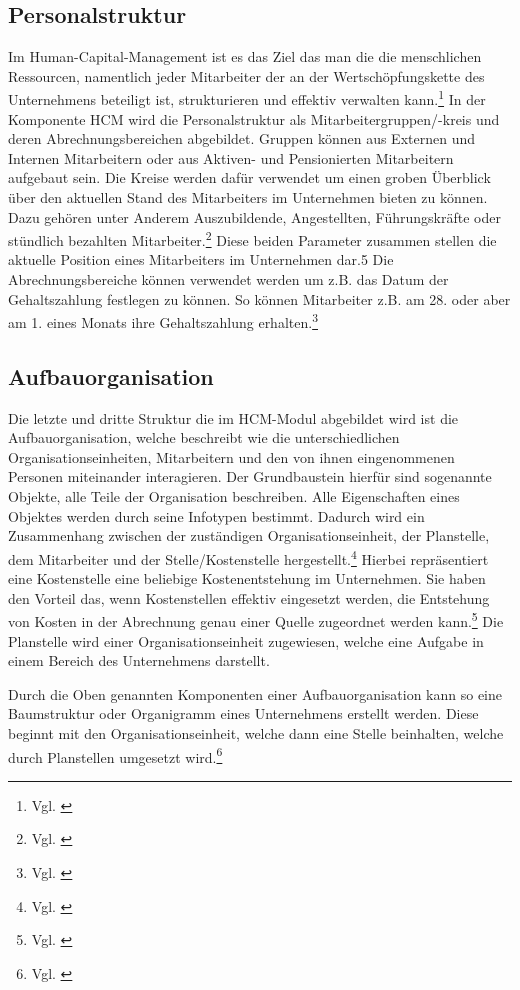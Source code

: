 \subsection{Personalstruktur}
Im Human-Capital-Management ist es das Ziel das man die die menschlichen Ressourcen, namentlich jeder Mitarbeiter der an der Wertschöpfungskette des Unternehmens beteiligt ist, strukturieren und effektiv verwalten kann.\footnote{Vgl. \cite{GablerWirtschaftslexikon2018}} In der Komponente HCM wird die Personalstruktur als Mitarbeitergruppen/-kreis und deren Abrechnungsbereichen abgebildet. Gruppen können aus Externen und Internen Mitarbeitern oder aus Aktiven-  und Pensionierten Mitarbeitern aufgebaut sein. Die Kreise werden dafür verwendet um einen groben Überblick über den aktuellen Stand des Mitarbeiters im Unternehmen bieten zu können. Dazu gehören unter Anderem Auszubildende, Angestellten, Führungskräfte oder stündlich bezahlten Mitarbeiter.\footnote{Vgl. \cite{SAPSE2024a}} Diese beiden Parameter zusammen stellen die aktuelle Position eines Mitarbeiters im Unternehmen dar.5 Die Abrechnungsbereiche können verwendet werden um z.B. das Datum der Gehaltszahlung festlegen zu können. So können Mitarbeiter z.B. am 28. oder aber am 1. eines Monats ihre Gehaltszahlung erhalten.\footnote{Vgl. \cite{SAPSE2024a}} 

\subsection{Aufbauorganisation}
Die letzte und dritte Struktur die im HCM-Modul abgebildet wird ist die Aufbauorganisation, welche beschreibt wie die unterschiedlichen Organisationseinheiten, Mitarbeitern und den von ihnen eingenommenen Personen miteinander interagieren. Der Grundbaustein hierfür sind sogenannte Objekte, alle Teile der Organisation beschreiben. Alle Eigenschaften eines Objektes werden durch seine Infotypen bestimmt. Dadurch wird ein Zusammenhang zwischen der zuständigen Organisationseinheit, der Planstelle, dem Mitarbeiter und der Stelle/Kostenstelle hergestellt.\footnote{Vgl. \cite{SSSUM2019a}} Hierbei repräsentiert eine Kostenstelle eine beliebige Kostenentstehung im Unternehmen. Sie haben den Vorteil das, wenn Kostenstellen effektiv eingesetzt werden, die Entstehung von Kosten in der Abrechnung genau einer Quelle zugeordnet werden kann.\footnote{Vgl. \cite{SAPSE2024b}} Die Planstelle wird einer Organisationseinheit zugewiesen, welche eine Aufgabe in einem Bereich des Unternehmens darstellt. 

Durch die Oben genannten Komponenten einer Aufbauorganisation kann so eine Baumstruktur oder Organigramm eines Unternehmens erstellt werden. Diese beginnt mit den Organisationseinheit, welche dann eine Stelle beinhalten, welche durch Planstellen umgesetzt wird.\footnote{Vgl. \cite{SAPSE2024c}} 

